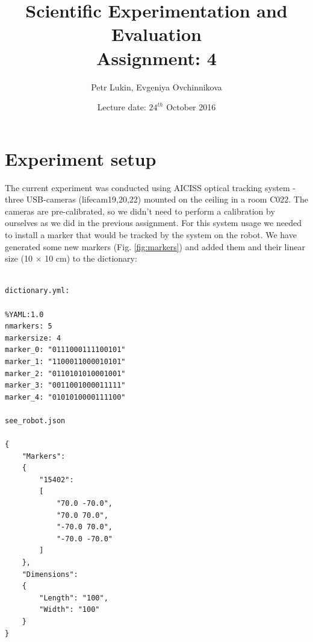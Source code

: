 \documentclass[a4paper, 12pt]{article}
\title{Scientific Experimentation and Evaluation  \\
				Assignment: 4}
\author{Petr Lukin, Evgeniya Ovchinnikova}
\date{Lecture date: $24^{th}$ October 2016}
\begin{document}



\maketitle

\section{Experiment setup}

The current experiment was conducted using AICISS optical tracking system - three USB-cameras (lifecam19,20,22) mounted on the ceiling in a room C022. The cameras are pre-calibrated, so we didn't need to perform a calibration by ourselves as we did in the previous assignment. For this system usage we needed to install a marker that would be tracked by the system on the robot. We have generated some new markers (Fig. \ref{fig:markers}) and added them and their linear size (10 $\times$ 10 cm) to the dictionary: 

\begin{lstlisting}

dictionary.yml:

%YAML:1.0
nmarkers: 5
markersize: 4
marker_0: "0111000111100101"
marker_1: "1100011000010101"
marker_2: "0110101010001001"
marker_3: "0011001000011111"
marker_4: "0101010000111100"

see_robot.json

{
    "Markers":
    {
        "15402":
        [
            "70.0 -70.0",
            "70.0 70.0",
            "-70.0 70.0",
            "-70.0 -70.0"
        ]
    },
    "Dimensions":
    {
        "Length": "100",
        "Width": "100"
    }
}

\end{lstlisting}
\end{document}
